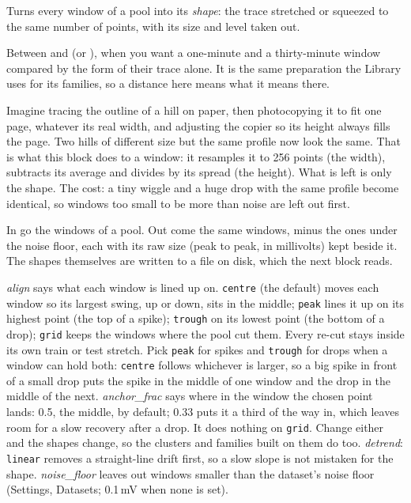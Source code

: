 Turns every window of a pool into its \emph{shape}: the trace stretched or squeezed to the
same number of points, with its size and level taken out.

Between  and  (or
), when you want a one-minute and a thirty-minute window
compared by the form of their trace alone. It is the same preparation the Library uses for
its families, so a distance here means what it means there.

\begin{plainterms}
Imagine tracing the outline of a hill on paper, then photocopying it to fit one page,
whatever its real width, and adjusting the copier so its height always fills the page. Two
hills of different size but the same profile now look the same. That is what this block does
to a window: it resamples it to 256 points (the width), subtracts its average and divides by
its spread (the height). What is left is only the shape. The cost: a tiny wiggle and a huge
drop with the same profile become identical, so windows too small to be more than noise are
left out first.
\end{plainterms}

In go the windows of a pool. Out come the same windows, minus the ones under the noise floor,
each with its raw size (peak to peak, in millivolts) kept beside it. The shapes themselves are
written to a file on disk, which the next block reads.

\emph{align} says what each window is lined up on. \texttt{centre} (the default) moves each
window so its largest swing, up or down, sits in the middle; \texttt{peak} lines it up on its
highest point (the top of a spike); \texttt{trough} on its lowest point (the bottom of a drop);
\texttt{grid} keeps the windows where the pool cut them. Every re-cut stays inside its own
train or test stretch. Pick \texttt{peak} for spikes and \texttt{trough} for drops when a
window can hold both: \texttt{centre} follows whichever is larger, so a big spike in front of a
small drop puts the spike in the middle of one window and the drop in the middle of the next.
\emph{anchor\_frac} says where in the window the chosen point lands: 0.5, the middle, by
default; 0.33 puts it a third of the way in, which leaves room for a slow recovery after a
drop. It does nothing on \texttt{grid}. Change either and the shapes change, so the clusters
and families built on them do too. \emph{detrend}: \texttt{linear} removes a straight-line drift first, so a
slow slope is not mistaken for the shape. \emph{noise\_floor} leaves out windows smaller than
the dataset's noise floor (Settings, Datasets; 0.1\,mV when none is set).

